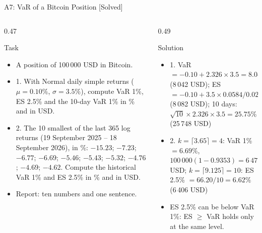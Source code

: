 \begin{frame}{A7: VaR of a Bitcoin Position [Solved]}
\itemsize{\scriptsize}
\begin{columns}[T]
\begin{column}{0.47\textwidth}
\begin{block}{Task}
\begin{itemize}
    \item A position of 100\,000 USD in Bitcoin.
    \item 1. With Normal daily simple returns ($\mu = 0.10\%$, $\sigma = 3.5\%$), compute VaR 1\%, ES 2.5\% and the 10-day VaR 1\% in \% and in USD.
    \item 2. The 10 smallest of the last 365 log returns (19 September 2025 -- 18 September 2026), in \%: $-15.23$; $-7.23$; $-6.77$; $-6.69$; $-5.46$; $-5.43$; $-5.32$; $-4.76$; $-4.69$; $-4.62$. Compute the historical VaR 1\% and ES 2.5\% in \% and in USD.
    \item Report: ten numbers and one sentence.
\end{itemize}
\end{block}
\end{column}
\begin{column}{0.49\textwidth}
\begin{exampleblock}{Solution}
\begin{itemize}
    \item 1. VaR $= -0.10 + 2.326 \times 3.5 = 8.04\%$ (8\,042 USD); ES $= -0.10 + 3.5 \times 0.0584/0.025 = 8.08\%$ (8\,082 USD); 10 days: $\sqrt{10} \times 2.326 \times 3.5 = 25.75\%$ (25\,748 USD)
    \item 2. $k = \lceil 3.65 \rceil = 4$: VaR 1\% $= 6.69\%$, $100\,000(1 - 0.9353) = 6\,471$ USD; $k = \lceil 9.125 \rceil = 10$: ES 2.5\% $= 66.20/10 = 6.62\%$ (6\,406 USD)
    \item ES 2.5\% can be below VaR 1\%: ES $\ge$ VaR holds only at the same level.
\end{itemize}
\end{exampleblock}
\end{column}
\end{columns}
\end{frame}

